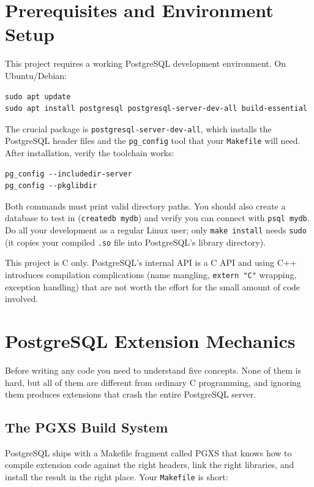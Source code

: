 \documentclass[11pt,a4paper]{article}
\begin{document}
\section{Prerequisites and Environment Setup}

This project requires a working PostgreSQL development environment. On Ubuntu/Debian:

\begin{codebox}
\begin{lstlisting}
sudo apt update
sudo apt install postgresql postgresql-server-dev-all build-essential
\end{lstlisting}
\end{codebox}

The crucial package is \texttt{postgresql-server-dev-all}, which installs the PostgreSQL header files and the \texttt{pg\_config} tool that your \texttt{Makefile} will need. After installation, verify the toolchain works:

\begin{codebox}
\begin{lstlisting}
pg_config --includedir-server
pg_config --pkglibdir
\end{lstlisting}
\end{codebox}

Both commands must print valid directory paths. You should also create a database to test in (\texttt{createdb mydb}) and verify you can connect with \texttt{psql mydb}. Do all your development as a regular Linux user; only \texttt{make install} needs \texttt{sudo} (it copies your compiled \texttt{.so} file into PostgreSQL's library directory).

This project is C only. PostgreSQL's internal API is a C API and using C++ introduces compilation complications (name mangling, \texttt{extern "C"} wrapping, exception handling) that are not worth the effort for the small amount of code involved.

\section{PostgreSQL Extension Mechanics}

Before writing any code you need to understand five concepts. None of them is hard, but all of them are different from ordinary C programming, and ignoring them produces extensions that crash the entire PostgreSQL server.

\subsection{The PGXS Build System}
PostgreSQL ships with a Makefile fragment called PGXS that knows how to compile extension code against the right headers, link the right libraries, and install the result in the right place. Your \texttt{Makefile} is short:
\end{document}

